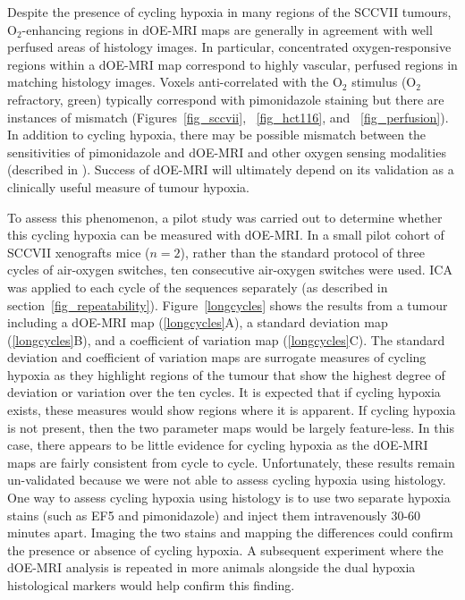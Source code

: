 Despite the presence of cycling hypoxia in many regions of the SCCVII tumours, O$_2$-enhancing regions in \acs{dOE-MRI} maps are generally in agreement with well perfused areas of histology images.
In particular, concentrated oxygen-responsive regions within a \acs{dOE-MRI} map correspond to highly vascular, perfused regions in matching histology images.
Voxels anti-correlated with the O$_2$ stimulus (O$_2$ refractory, green) typically correspond with pimonidazole staining but there are instances of mismatch (Figures~\ref{fig_sccvii}, ~\ref{fig_hct116}, and ~\ref{fig_perfusion}).
In addition to cycling hypoxia, there may be possible mismatch between the sensitivities of pimonidazole and dOE-MRI and other oxygen sensing modalities (described in \cite{Horsman:2012kw}).
Success of \acs{dOE-MRI} will ultimately depend on its validation as a clinically useful measure of tumour hypoxia.

To assess this phenomenon, a pilot study was carried out to determine whether this cycling hypoxia can be measured with \acs{dOE-MRI}.
In a small pilot cohort of SCCVII xenografts mice ($n=2$), rather than the standard protocol of three cycles of air-oxygen switches, ten consecutive air-oxygen switches were used.
\acs{ICA} was applied to each cycle of the sequences separately (as described in section~\ref{fig_repeatability}).
Figure~\ref{longcycles} shows the results from a tumour including a \acs{dOE-MRI} map (\ref{longcycles}A), a standard deviation map (\ref{longcycles}B), and a coefficient of variation map (\ref{longcycles}C).
The standard deviation and coefficient of variation maps are surrogate measures of cycling hypoxia as they highlight regions of the tumour that show the highest degree of deviation or variation over the ten cycles.
It is expected that if cycling hypoxia exists, these measures would show regions where it is apparent. 
If cycling hypoxia is not present, then the two parameter maps would be largely feature-less.
In this case, there appears to be little evidence for cycling hypoxia as the \acs{dOE-MRI} maps are fairly consistent from cycle to cycle.
Unfortunately, these results remain un-validated because we were not able to assess cycling hypoxia using histology.
One way to assess cycling hypoxia using histology is to use two separate hypoxia stains (such as EF5 and pimonidazole) and inject them intravenously 30-60 minutes apart.
Imaging the two stains and mapping the differences could confirm the presence or absence of cycling hypoxia. 
A subsequent experiment where the \acs{dOE-MRI} analysis is repeated in more animals alongside the dual hypoxia histological markers would help confirm this finding.

